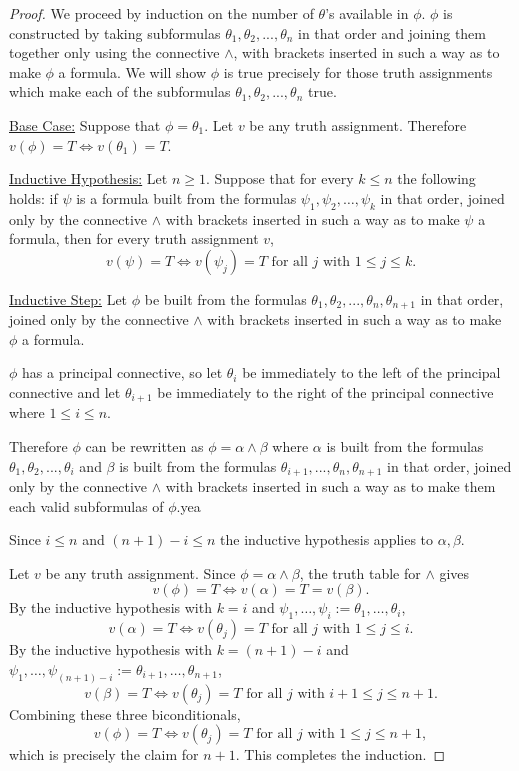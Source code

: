\documentclass{article}
\theoremstyle{remark}\newtheorem{remark}{Remark}
\theoremstyle{plain}
\begin{document}
\begin{proof}
    We proceed by induction on the number of $\theta$'s available in $\phi$.
    $\phi$ is constructed by taking subformulas $\theta_1, \theta_2, ... , \theta_n$ in that order and joining them together only using the connective $\land$, with brackets inserted in such a way as to make $\phi$ a formula.
    We will show $\phi$ is true precisely for those truth assignments which make each of the subformulas $\theta_1, \theta_2, ... , \theta_n$ true.
    
    \underline{Base Case:}
    Suppose that $\phi = \theta_1$. Let $v$ be any truth assignment. Therefore $v(\phi) = T \iff v(\theta_1) = T$.

    \underline{Inductive Hypothesis:}
    Let $n \geq 1$. Suppose that for every $k \leq n$ the following holds: if $\psi$ is a formula built from the formulas $\psi_1, \psi_2, \ldots, \psi_k$ in that order, joined only by the connective $\land$ with brackets inserted in such a way as to make $\psi$ a formula, then for every truth assignment $v$,
    \[
        v(\psi) = T \iff v(\psi_j) = T \text{ for all } j \text{ with } 1 \leq j \leq k.
    \]

    \underline{Inductive Step:}
    Let $\phi$ be built from the formulas $\theta_1, \theta_2, ..., \theta_n, \theta_{n+1}$ in that order, joined only by the connective $\land$ with brackets inserted in such a way as to make $\phi$ a formula.

     $\phi$ has a principal connective, so let $\theta_i$ be immediately to the left of the principal connective and let $\theta_{i+1}$ be immediately to the right of the principal connective where $1 \leq i \leq n$.
     
     Therefore $\phi$ can be rewritten as $\phi = \alpha \land \beta$ where $\alpha$ is built from the formulas $\theta_1, \theta_2, ... , \theta_i$ and $\beta$ is built from the formulas $\theta_{i + 1}, ... , \theta_n, \theta_{n + 1}$ in that order, joined only by the connective $\land$ with brackets inserted in such a way as to make them each valid subformulas of $\phi$.yea

     Since $i \leq n$ and $(n + 1) - i \leq n$ the inductive hypothesis applies to $\alpha, \beta$.

     Let $v$ be any truth assignment. Since $\phi = \alpha \land \beta$, the truth table for $\land$ gives
     \[
         v(\phi) = T \iff v(\alpha) = T = v(\beta).
     \]
     By the inductive hypothesis with $k = i$ and $\psi_1, \ldots, \psi_i := \theta_1, \ldots, \theta_i$,
     \[
         v(\alpha) = T \iff v(\theta_j) = T \text{ for all } j \text{ with } 1 \leq j \leq i.
     \]
     By the inductive hypothesis with $k = (n+1) - i$ and $\psi_1, \ldots, \psi_{(n+1)-i} := \theta_{i+1}, \ldots, \theta_{n+1}$,
     \[
         v(\beta) = T \iff v(\theta_j) = T \text{ for all } j \text{ with } i+1 \leq j \leq n+1.
     \]
     Combining these three biconditionals,
     \[
         v(\phi) = T \iff v(\theta_j) = T \text{ for all } j \text{ with } 1 \leq j \leq n+1,
     \]
     which is precisely the claim for $n+1$. This completes the induction.
\end{proof}
\end{document}
